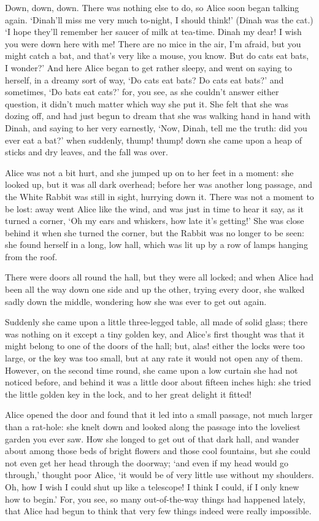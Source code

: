 \documentclass[12pt]{article}
\begin{document}
\begin{Parallel}[p]{}{}
{Down, down, down. There was nothing else to do, so Alice soon began talking again. ‘Dinah’ll miss me very much to-night, I should think!’ (Dinah was the cat.) ‘I hope they’ll remember her saucer of milk at tea-time. Dinah my dear! I wish you were down here with me! There are no mice in the air, I’m afraid, but you might catch a bat, and that’s very like a mouse, you know. But do cats eat bats, I wonder?’ And here Alice began to get rather sleepy, and went on saying to herself, in a dreamy sort of way, ‘Do cats eat bats? Do cats eat bats?’ and sometimes, ‘Do bats eat cats?’ for, you see, as she couldn’t answer either question, it didn’t much matter which way she put it. She felt that she was dozing off, and had just begun to dream that she was walking hand in hand with Dinah, and saying to her very earnestly, ‘Now, Dinah, tell me the truth: did you ever eat a bat?’ when suddenly, thump! thump! down she came upon a heap of sticks and dry leaves, and the fall was over.

Alice was not a bit hurt, and she jumped up on to her feet in a moment: she looked up, but it was all dark overhead; before her was another long passage, and the White Rabbit was still in sight, hurrying down it. There was not a moment to be lost: away went Alice like the wind, and was just in time to hear it say, as it turned a corner, ‘Oh my ears and whiskers, how late it’s getting!’ She was close behind it when she turned the corner, but the Rabbit was no longer to be seen: she found herself in a long, low hall, which was lit up by a row of lamps hanging from the roof.

There were doors all round the hall, but they were all locked; and when Alice had been all the way down one side and up the other, trying every door, she walked sadly down the middle, wondering how she was ever to get out again.

Suddenly she came upon a little three-legged table, all made of solid glass; there was nothing on it except a tiny golden key, and Alice’s first thought was that it might belong to one of the doors of the hall; but, alas! either the locks were too large, or the key was too small, but at any rate it would not open any of them. However, on the second time round, she came upon a low curtain she had not noticed before, and behind it was a little door about fifteen inches high: she tried the little golden key in the lock, and to her great delight it fitted!

Alice opened the door and found that it led into a small passage, not much larger than a rat-hole: she knelt down and looked along the passage into the loveliest garden you ever saw. How she longed to get out of that dark hall, and wander about among those beds of bright flowers and those cool fountains, but she could not even get her head through the doorway; ‘and even if my head would go through,’ thought poor Alice, ‘it would be of very little use without my shoulders. Oh, how I wish I could shut up like a telescope! I think I could, if I only knew how to begin.’ For, you see, so many out-of-the-way things had happened lately, that Alice had begun to think that very few things indeed were really impossible.

}
\end{Parallel}
\end{document}
